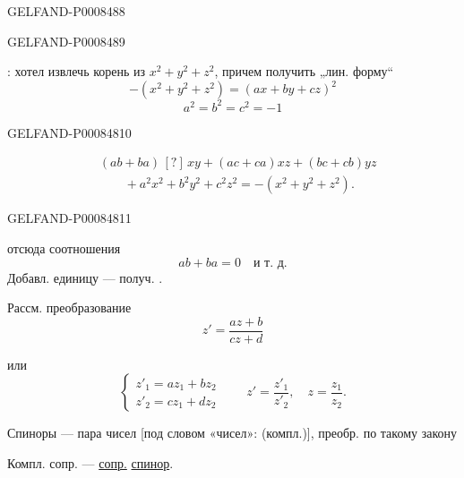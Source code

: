 \begin{GelfandAdjacentEvidence}{GELFAND-P000848}{8}

\end{GelfandAdjacentEvidence}
\begin{GelfandAdjacentEvidence}{GELFAND-P000848}{9}


: хотел извлечь корень из \(x^2+y^2+z^2\), причем получить „лин. форму“
\[
-(x^2+y^2+z^2)=(ax+by+cz)^2
\]
\[
a^2=b^2=c^2=-1
\]
\end{GelfandAdjacentEvidence}
\begin{GelfandAdjacentEvidence}{GELFAND-P000848}{10}

\[
\begin{aligned}
&(ab+ba)\,[?]\,xy+(ac+ca)xz+(bc+cb)yz\\
&\qquad{}+a^2x^2+b^2y^2+c^2z^2=-(x^2+y^2+z^2).
\end{aligned}
\]
\end{GelfandAdjacentEvidence}
\begin{GelfandAdjacentEvidence}{GELFAND-P000848}{11}


отсюда соотношения
\[
ab+ba=0 \quad \text{и т. д.}
\]
Добавл. единицу — получ. .

Рассм. преобразование
\[
z'=\frac{az+b}{cz+d}
\]

или
\[
\begin{cases}
z'_1=az_1+bz_2\\
z'_2=cz_1+dz_2
\end{cases}
\qquad z'=\frac{z'_1}{z'_2},\quad z=\frac{z_1}{z_2}.
\]

Спиноры — пара чисел [под словом «чисел»: (компл.)], преобр. по такому закону

Компл. сопр. — \uline{сопр.} \uline{спинор}.
\end{GelfandAdjacentEvidence}
